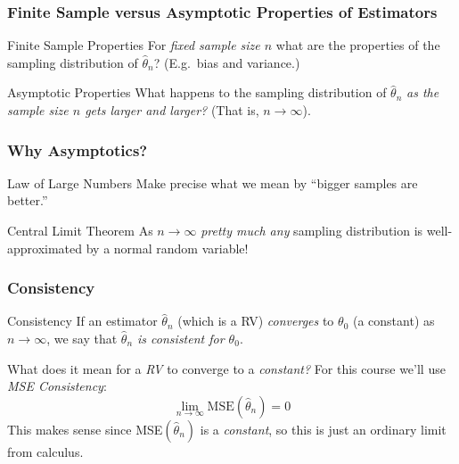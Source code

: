 \begin{frame}
\begin{columns}
\end{columns} 


\end{frame}
\begin{frame}
\frametitle{Finite Sample versus Asymptotic Properties of Estimators}

\begin{block}{Finite Sample Properties}
For \alert{\emph{fixed sample size $n$}} what are the properties of the sampling distribution of $\widehat{\theta}_n$? (E.g.\ bias and variance.)
\end{block}
\begin{block}{Asymptotic Properties}
What happens to the sampling distribution of $\widehat{\theta}_n$ \alert{\emph{as the sample size $n$ gets larger and larger?}} (That is, $n\rightarrow \infty$).
\end{block}

\end{frame}
\begin{frame}
\frametitle{Why Asymptotics?}

\begin{block}{Law of Large Numbers}
Make precise what we mean by ``bigger samples are better.'' 
\end{block}
\begin{block}{Central Limit Theorem}
As $n\rightarrow \infty$  \emph{\alert{pretty much any}} sampling distribution is well-approximated by a normal random variable!
\end{block}


\end{frame}
\begin{frame}
\frametitle{Consistency}

\begin{block}{Consistency}
If an estimator $\widehat{\theta}_n$ (which is a RV) \emph{converges} to $\theta_0$ (a constant) as $n\rightarrow \infty$, we say that \emph{\alert{$\widehat{\theta}_n$ is consistent for $\theta_0$}}.
\end{block}
\vspace{2em}

\begin{alertblock}{What does it mean for a \emph{RV} to converge to a \emph{constant?}}
For this course we'll use \emph{MSE Consistency}:
	$$\lim_{n \rightarrow \infty}\mbox{MSE}(\widehat{\theta}_n) = 0$$
This makes sense since MSE$(\widehat{\theta}_n)$ is a \emph{constant}, so this is just an ordinary limit from calculus.
\end{alertblock}

\end{frame}

